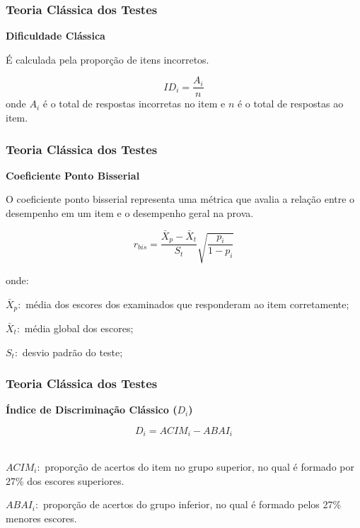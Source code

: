 \documentclass{beamer}
\begin{document}
	\begin{frame}
		
		\frametitle{Teoria Clássica dos Testes}
		
		\begin{center}
			\textbf{Dificuldade Clássica}
		\end{center}
		
		É calculada pela proporção de itens incorretos.
		
		\[
		ID_i =\dfrac{A_i}{n} 
		\]
		onde $A_i$ é o total de respostas incorretas no item e $n$ é o total de respostas ao item. 
		
	\end{frame}	
	
	\begin{frame}
		
		\frametitle{Teoria Clássica dos Testes}
		\begin{center}
			\textbf{Coeficiente Ponto Bisserial}
		\end{center}
		O coeficiente ponto bisserial representa uma métrica que avalia a relação entre o desempenho em um item e o desempenho geral na prova.
	
		
		\[
		r_{bis} = \frac{\bar{X}_p - \bar{X}_t}{S_t}
		\sqrt{\frac{p_i}{1 - p_i}}
		\]
		
		
		onde:
		
		
		$ \bar{X}_p :$ média dos escores dos examinados que responderam ao item corretamente;
		
		$ \bar{X}_t :$  média global dos escores;
		
		$ S_t :$  desvio padrão do teste;
	\end{frame}
	
	\begin{frame}
		
			\frametitle{Teoria Clássica dos Testes}
		\begin{center}
			\textbf{Índice de Discriminação Clássico ($D_i$)}
		\end{center}
		
		\[D_i =  ACIM_i - ABAI_i\]  \\ 
		
		\hspace{0.5in}
		
		 $ACIM_i:$ proporção de acertos do item no grupo superior, no qual é formado por 27\% dos escores superiores. \\ 
		
		\hspace{0.5in}
		 
		 $ABAI_i:$ proporção de acertos do grupo inferior, no qual é formado pelos 27\% menores escores. 
		
	\end{frame}
	
\end{document}
